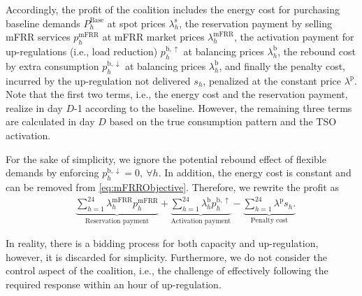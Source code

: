 \documentclass[conference]{IEEEtran}
\begin{document}
Accordingly, the profit of the coalition includes the energy cost for purchasing baseline demands $P^{\text{Base}}_{h}$ at spot prices $\lambda^{\text{s}}_{h}$, the reservation payment by selling mFRR services $p^{\text{mFRR}}_{h}$ at mFRR market prices $\lambda_{h}^{\text{mFRR}}$, the activation payment for up-regulations (i.e., load reduction) $p^{\text{b},\uparrow}_{h}$ at balancing prices $\lambda_{h}^{\text{b}}$, the rebound cost by extra consumption $p^{\text{b},\downarrow}_{h}$ at balancing prices $\lambda_{h}^{\text{b}}$, and finally the penalty cost, incurred by the up-regulation not delivered $s_{h}$, penalized at the constant price $\lambda^{\text{p}}$. Note that the first two terms, i.e., the energy cost and the reservation payment, realize in day $D$-1 according to the baseline. However, the remaining three terms are calculated in day $D$ based on the true consumption pattern and the TSO activation.



For the sake of simplicity, we ignore the potential rebound effect of flexible demands by enforcing $p_{h}^{\text{b}, \downarrow} = 0, \ \forall{h}$. In addition, the energy cost is constant and can be removed from \eqref{eq:mFRRObjective}. Therefore, we rewrite the profit as
%
\begin{align}\label{eq:mFRR_profit}
     & \underbrace{\sum_{h=1}^{24}\lambda_{h}^{\text{mFRR}} p^{\text{mFRR}}_{h}}_{\textrm{Reservation payment}} + \underbrace{\sum_{h=1}^{24}  \lambda_{h}^{\text{b}} p^{\text{b},\uparrow}_{h}}_{\textrm{Activation payment}} - \underbrace{ \sum_{h=1}^{24}  \lambda^{\text{p}}s_{h}.}_{\textrm{Penalty cost}}
\end{align}


In reality, there is a bidding process for both capacity and up-regulation, however, it is discarded for simplicity. Furthermore, we do not consider the control aspect of the coalition, i.e., the challenge of effectively following the required response within an hour of up-regulation.
\end{document}
